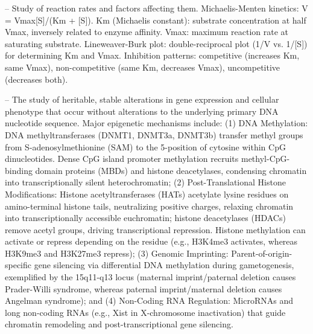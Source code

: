 -- Study of reaction rates and factors affecting them. Michaelis-Menten kinetics: V = Vmax[S]/(Km + [S]). Km (Michaelis constant): substrate concentration at half Vmax, inversely related to enzyme affinity. Vmax: maximum reaction rate at saturating substrate. Lineweaver-Burk plot: double-reciprocal plot (1/V vs. 1/[S]) for determining Km and Vmax. Inhibition patterns: competitive (increases Km, same Vmax), non-competitive (same Km, decreases Vmax), uncompetitive (decreases both).

-- The study of heritable, stable alterations in gene expression and cellular phenotype that occur without alterations to the underlying primary DNA nucleotide sequence. Major epigenetic mechanisms include: (1) DNA Methylation: DNA methyltransferases (DNMT1, DNMT3a, DNMT3b) transfer methyl groups from S-adenosylmethionine (SAM) to the 5-position of cytosine within CpG dinucleotides. Dense CpG island promoter methylation recruits methyl-CpG-binding domain proteins (MBDs) and histone deacetylases, condensing chromatin into transcriptionally silent heterochromatin; (2) Post-Translational Histone Modifications: Histone acetyltransferases (HATs) acetylate lysine residues on amino-terminal histone tails, neutralizing positive charges, relaxing chromatin into transcriptionally accessible euchromatin; histone deacetylases (HDACs) remove acetyl groups, driving transcriptional repression. Histone methylation can activate or repress depending on the residue (e.g., H3K4me3 activates, whereas H3K9me3 and H3K27me3 repress); (3) Genomic Imprinting: Parent-of-origin-specific gene silencing via differential DNA methylation during gametogenesis, exemplified by the 15q11-q13 locus (maternal imprint/paternal deletion causes Prader-Willi syndrome, whereas paternal imprint/maternal deletion causes Angelman syndrome); and (4) Non-Coding RNA Regulation: MicroRNAs and long non-coding RNAs (e.g., Xist in X-chromosome inactivation) that guide chromatin remodeling and post-transcriptional gene silencing.

